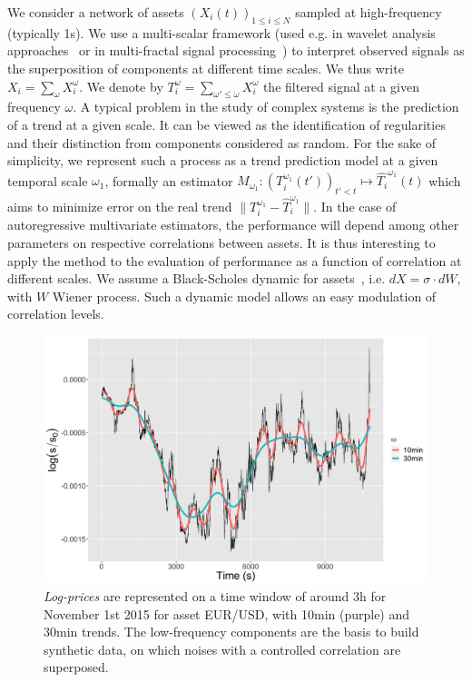 \documentclass{bmcart}
\newcommand{\norm}[1]{\| #1 \|}
\begin{document}
We consider a network of assets $(X_i(t))_{1\leq i \leq N}$ sampled at high-frequency (typically 1s). We use a multi-scalar framework (used e.g. in wavelet analysis approaches~\cite{ramsey2002wavelets} or in multi-fractal signal processing~\cite{bouchaud2000apparent}) to interpret observed signals as the superposition of components at different time scales. We thus write $X_i=\sum_{\omega}{X_i^{\omega}}$. We denote by $T_i^{\omega} = \sum_{\omega' \leq \omega} X_i^{\omega}$ the filtered signal at a given frequency $\omega$. A typical problem in the study of complex systems is the prediction of a trend at a given scale. It can be viewed as the identification of regularities and their distinction from components considered as random. For the sake of simplicity, we represent such a process as a trend prediction model at a given temporal scale $\omega_1$, formally an estimator $M_{\omega_1} : (T_i^{\omega_1}(t'))_{t'<t} \mapsto \hat{T_i}^{\omega_1}(t)$ which aims to minimize error on the real trend $\norm{T_i^{\omega_1} - \hat{T}_i^{\omega_1}}$. In the case of autoregressive multivariate estimators, the performance will depend among other parameters on respective correlations between assets. It is thus interesting to apply the method to the evaluation of performance as a function of correlation at different scales. We assume a Black-Scholes dynamic for assets~\cite{jarrow1999honor}, i.e. $dX = \sigma\cdot dW$, with $W$ Wiener process. Such a dynamic model allows an easy modulation of correlation levels.


      
\begin{figure}[h!]
\includegraphics[width=\columnwidth]{figures/Fig3.png}
\caption{ \emph{Log-prices} are represented on a time window of around 3h for November 1st 2015 for asset EUR/USD, with 10min (purple) and 30min trends. The low-frequency components are the basis to build synthetic data, on which noises with a controlled correlation are superposed.\label{fig:example_signal}}
\end{figure}
\end{document}
